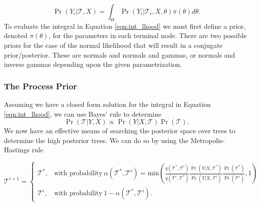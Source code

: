 \documentclass{article}
\begin{document}
\begin{equation}\label{eqn:int_lhood}
\Pr(Y_i \vert \mathcal{T}, X) = \int_{\Theta}\Pr(Y_i \vert \mathcal{T}_i, X, \theta)\pi(\theta)d\theta.
\end{equation}
To evaluate the integral in Equation \ref{eqn:int_lhood} we must first define a prior, denoted $\pi(\theta)$, for the parameters in each terminal node. 
There are two possible priors for the case of the normal likelihood that will result in a conjugate prior/posterior. These are normals and normals and gammas, or normals and inverse gammas depending upon the given parametrization. 


\subsubsection{The Process Prior}

Assuming we have a closed form solution for the integral in Equation \ref{eqn:int_lhood}, we can use Bayes' rule to determine 
\begin{equation}\label{eqn:tree_post}
\Pr(\mathcal{T} \vert Y , X) \propto \Pr(Y \vert X ,\mathcal{T})\Pr(\mathcal{T}).
\end{equation} 
We now have an effective means of searching the posterior space over trees to determine the high posterior trees. We can do so by using the Metropolis-Hastings rule 

\begin{equation}\label{eqn:MHrule}
\mathcal{T}^{i+1} =\begin{cases}
\mathcal{T}^*, & \text{with probability}\ \alpha(\mathcal{T}^*, \mathcal{T}^i) = \text{min}\left(\frac{q(\mathcal{T}^*, \mathcal{T}^i)}{q(\mathcal{T}^i, \mathcal{T}^*)}\frac{\Pr(Y\vert X, \mathcal{T}^*)}{\Pr(Y\vert X,\mathcal{T}^i)}\frac{\Pr(\mathcal{T}^{*})}{\Pr(\mathcal{T}^i)},1 \right) \\
\mathcal{T}^{i}, & \text{with probability}\ 1-\alpha(\mathcal{T}^*, \mathcal{T}^i).
\end{cases} \end{equation}
\end{document}
